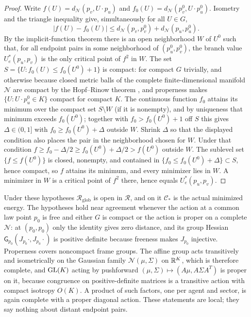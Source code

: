 \begin{proof}
Write $f(U)=d_{\mathcal N}(p_v,U\cdot p_u)$ and $f_0(U)=d_{\mathcal N}(p^0_v,U\cdot p^0_u)$. Isometry and the triangle inequality give, simultaneously for all $U\in G$,
\begin{equation}
 |f(U)-f_0(U)|\leq d_{\mathcal N}(p_v,p^0_v)+d_{\mathcal N}(p_u,p^0_u).
\end{equation}
By the implicit-function theorem there is an open neighborhood $W$ of $U^0$ such that, for all endpoint pairs in some neighborhood of $(p^0_u,p^0_v)$, the branch value $U^*_e(p_u,p_v)$ is the only critical point of $f^2$ in $W$. The set $S=\{U:f_0(U)\leq f_0(U^0)+1\}$ is compact: for compact $G$ trivially, and otherwise because closed metric balls of the complete finite-dimensional manifold $\mathcal N$ are compact by the Hopf--Rinow theorem \cite{Lee2018}, and properness makes $\{U:U\cdot p^0_u\in K\}$ compact for compact $K$. The continuous function $f_0$ attains its minimum over the compact set $S\setminus W$ (if it is nonempty), and by uniqueness that minimum exceeds $f_0(U^0)$; together with $f_0>f_0(U^0)+1$ off $S$ this gives $\Delta\in(0,1]$ with $f_0\geq f_0(U^0)+\Delta$ outside $W$. Shrink $\Delta$ so that the displayed condition also places the pair in the neighborhood chosen for $W$. Under that condition $f\geq f_0-\Delta/2\geq f_0(U^0)+\Delta/2>f(U^0)$ outside $W$. The sublevel set $\{f\leq f(U^0)\}$ is closed, nonempty, and contained in $\{f_0\leq f_0(U^0)+\Delta\}\subset S$, hence compact, so $f$ attains its minimum, and every minimizer lies in $W$. A minimizer in $W$ is a critical point of $f^2$ there, hence equals $U^*_e(p_u,p_v)$.
\end{proof}

Under these hypotheses $\mathcal R_{\mathrm{glob}}$ is open in $\mathcal R$, and on it $\mathcal C_*$ is the actual minimized energy. The hypotheses hold near agreement whenever the action at a common law point $p_0$ is free and either $G$ is compact or the action is proper on a complete $\mathcal N$: at $(p_0,p_0)$ only the identity gives zero distance, and its group Hessian $\mathsf G_{p_0}(J_{p_0}\cdot,J_{p_0}\cdot)$ is positive definite because freeness makes $J_{p_0}$ injective. Properness covers noncompact frame groups. The affine group acts transitively and isometrically on the Gaussian family $\mathcal N(\mu,\Sigma)$ on $\mathbb R^K$, which is therefore complete, and $\mathrm{GL}(K)$ acting by pushforward $(\mu,\Sigma)\mapsto(A\mu,A\Sigma A^T)$ is proper on it, because congruence on positive-definite matrices is a transitive action with compact isotropy $O(K)$. A product of such factors, one per agent and sector, is again complete with a proper diagonal action. These statements are local; they say nothing about distant endpoint pairs.

